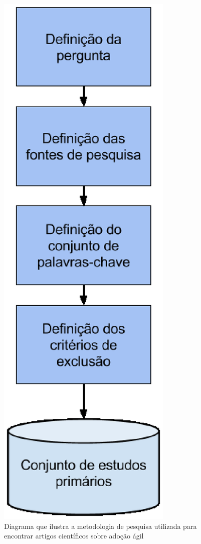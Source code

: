 		\begin{figure}[H]
			\centering
			\captionsetup{justification=centering,margin=2cm}
			\includegraphics[scale=0.35]{capitulos/literatura/metodologia.eps}
			\caption{Diagrama que ilustra a metodologia de pesquisa utilizada para encontrar artigos científicos sobre adoção ágil}
			\label{fig:metodologia}
		\end{figure}
		
